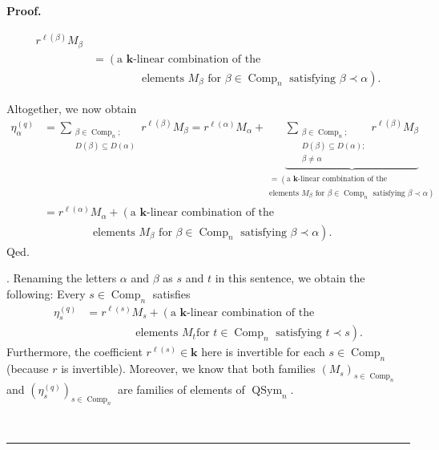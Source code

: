 \documentclass[numbers=enddot,12pt,final,onecolumn,notitlepage]{scrartcl}%
\theoremstyle{definition}
\newenvironment{proof}[1][Proof]{\noindent\textbf{#1.} }{\ \rule{0.5em}{0.5em}}
\let\sumnonlimits\sum
\renewcommand{\sum}{\sumnonlimits\limits}
\newenvironment{verlong}{}{}
\begin{document}
\begin{verlong}
\begin{proof}
{\begin{align*}
{}r^{\ell\left(  \beta\right)  }M_{\beta}\\
&  =\left(  \text{a }\mathbf{k}\text{-linear combination of the}\right. \\
&  \ \ \ \ \ \ \ \ \ \ \ \ \ \ \ \ \ \ \ \ \left.  \text{elements }M_{\beta
}\text{ for }\beta\in\operatorname*{Comp}\nolimits_{n}\text{ satisfying }%
\beta\prec\alpha\right)  .
\end{align*}
\par
Altogether, we now obtain%
\begin{align*}
\eta_{\alpha}^{\left(  q\right)  }  &  =\sum_{\substack{\beta\in
\operatorname*{Comp}\nolimits_{n};\\D\left(  \beta\right)  \subseteq D\left(
\alpha\right)  }}r^{\ell\left(  \beta\right)  }M_{\beta}=r^{\ell\left(
\alpha\right)  }M_{\alpha}+\underbrace{\sum_{\substack{\beta\in
\operatorname*{Comp}\nolimits_{n};\\D\left(  \beta\right)  \subseteq D\left(
\alpha\right)  ;\\\beta\neq\alpha}}r^{\ell\left(  \beta\right)  }M_{\beta}%
}_{\substack{=\left(  \text{a }\mathbf{k}\text{-linear combination of
the}\right.  \\\left.  \text{elements }M_{\beta}\text{ for }\beta
\in\operatorname*{Comp}\nolimits_{n}\text{ satisfying }\beta\prec
\alpha\right)  }}\\
&  =r^{\ell\left(  \alpha\right)  }M_{\alpha}+\left(  \text{a }\mathbf{k}%
\text{-linear combination of the}\right. \\
&  \ \ \ \ \ \ \ \ \ \ \ \ \ \ \ \ \ \ \ \ \left.  \text{elements }M_{\beta
}\text{ for }\beta\in\operatorname*{Comp}\nolimits_{n}\text{ satisfying }%
\beta\prec\alpha\right)  .
\end{align*}
Qed.}. Renaming the letters $\alpha$ and $\beta$ as $s$ and $t$ in this
sentence, we obtain the following: Every $s\in\operatorname*{Comp}%
\nolimits_{n}$ satisfies%
\begin{align*}
\eta_{s}^{\left(  q\right)  }  &  =r^{\ell\left(  s\right)  }M_{s}+\left(
\text{a }\mathbf{k}\text{-linear combination of the}\right. \\
&  \ \ \ \ \ \ \ \ \ \ \ \ \ \ \ \ \ \ \ \ \left.  \text{elements }M_{t}\text{
for }t\in\operatorname*{Comp}\nolimits_{n}\text{ satisfying }t\prec s\right)
.
\end{align*}
Furthermore, the coefficient $r^{\ell\left(  s\right)  }\in\mathbf{k}$ here is
invertible for each $s\in\operatorname*{Comp}\nolimits_{n}$ (because $r$ is
invertible). Moreover, we know that both families $\left(  M_{s}\right)
_{s\in\operatorname*{Comp}\nolimits_{n}}$ and $\left(  \eta_{s}^{\left(
q\right)  }\right)  _{s\in\operatorname*{Comp}\nolimits_{n}}$ are families of
elements of $\operatorname*{QSym}\nolimits_{n}$.


\end{proof}
\end{verlong}
\end{document}
